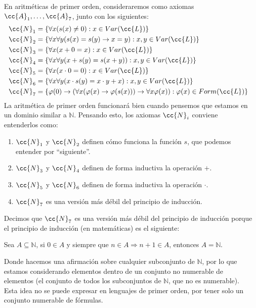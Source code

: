 En aritméticas de primer orden, consideraremos como axiomas $\cc{A}_1,\ldots,\cc{A}_7$, junto con los siguientes:
\begin{align*}
    \cc{N}_1 & = \{\forall x(s(x)\neq 0) : x\in Var(\cc{L})\} \\
    \cc{N}_2 &= \{\forall x\forall y(s(x) = s(y) \to x=y) : x,y\in Var(\cc{L})\} \\
    \cc{N}_3 &= \{\forall x(x+0=x):x\in Var(\cc{L})\} \\
    \cc{N}_4 &= \{\forall x\forall y(x+s(y) = s(x+y)) : x,y \in Var(\cc{L})\} \\
    \cc{N}_5 &= \{\forall x(x\cdot 0=0):x\in Var(\cc{L})\} \\
    \cc{N}_6 &= \{\forall x\forall y(x\cdot s(y) = x\cdot y+x) : x,y\in Var(\cc{L})\} \\
    \cc{N}_7 &= \{\varphi(0) \to (\forall x(\varphi(x)\to \varphi(s(x))) \to \forall x\varphi(x)) : \varphi(x) \in Form(\cc{L})\}
\end{align*}
La aritmética de primer orden funcionará bien cuando pensemos que estamos en un dominio similar a $\mathbb{N}$. Pensando esto, los axiomas $\cc{N}_i$ conviene entenderlos como:
\begin{enumerate}
    \item $\cc{N}_1$ y $\cc{N}_2$ definen cómo funciona la función $s$, que podemos entender por ``siguiente''.
    \item $\cc{N}_3$ y $\cc{N}_4$ definen de forma inductiva la operación $+$.
    \item $\cc{N}_5$ y $\cc{N}_6$ definen de forma inductiva la operación $\cdot $.
    \item $\cc{N}_7$ es una versión más débil del principio de inducción.
\end{enumerate}

Decimos que $\cc{N}_7$ es una versión más débil del principio de inducción porque el principio de inducción (en matemáticas) es el siguiente:
\begin{prop}
    Sea $A\subseteq \mathbb{N}$, si $0\in A$ y siempre que $n\in A\Longrightarrow n+1\in A$, entonces $A = \mathbb{N}$.
\end{prop}
Donde hacemos una afirmación sobre cualquier subconjunto de $\mathbb{N}$, por lo que estamos considerando elementos dentro de un conjunto no numerable de elementos (el conjunto de todos los subconjuntos de $\mathbb{N}$, que no es numerable). Esta idea no se puede expresar en lenguajes de primer orden, por tener solo un conjunto numerable de fórmulas.

